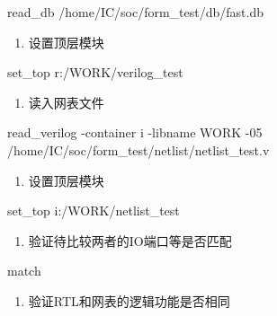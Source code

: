 \begin{CodeBlock}[language=BookTcl]
read_db { /home/IC/soc/form_test/db/fast.db }
\end{CodeBlock}

\begin{enumerate}
\def\labelenumi{\arabic{enumi}.}
\setcounter{enumi}{4}
\tightlist
\item
  设置顶层模块
\end{enumerate}

\begin{CodeBlock}[language=BookTcl]
set_top r:/WORK/verilog_test
\end{CodeBlock}

\begin{enumerate}
\def\labelenumi{\arabic{enumi}.}
\setcounter{enumi}{5}
\tightlist
\item
  读入网表文件
\end{enumerate}

\begin{CodeBlock}[language=BookTcl]
read_verilog -container i -libname WORK -05 { /home/IC/soc/form_test/netlist/netlist_test.v }
\end{CodeBlock}

\begin{enumerate}
\def\labelenumi{\arabic{enumi}.}
\setcounter{enumi}{6}
\tightlist
\item
  设置顶层模块
\end{enumerate}

\begin{CodeBlock}[language=BookTcl]
set_top i:/WORK/netlist_test
\end{CodeBlock}

\begin{enumerate}
\def\labelenumi{\arabic{enumi}.}
\setcounter{enumi}{7}
\tightlist
\item
  验证待比较两者的IO端口等是否匹配
\end{enumerate}

\begin{CodeBlock}[language=BookTcl]
match
\end{CodeBlock}

\begin{enumerate}
\def\labelenumi{\arabic{enumi}.}
\setcounter{enumi}{8}
\tightlist
\item
  验证RTL和网表的逻辑功能是否相同
\end{enumerate}

